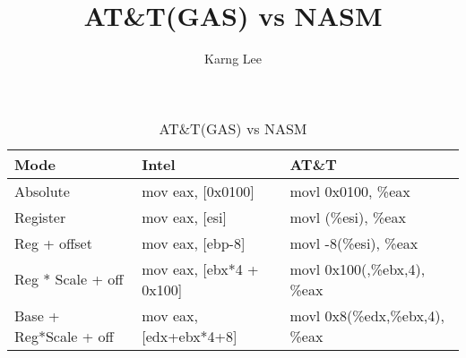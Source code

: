 \documentclass{article}
\title{AT\&T(GAS) vs NASM}
\author{Karng Lee}
\theoremstyle{mytheoremstyle}
\theoremstyle{mytheoremstyle}
\theoremstyle{myproblemstyle}
\begin{document}
    \maketitle
\begin{table}   
  \begin{center}
  \begin{tabular}{|l||l|l|}
    \hline
    Mode & Intel & AT\&T \\
    \hline
    \hline
    Absolute & mov eax, [0x0100] & movl 0x0100, \%eax \\
    \hline
    Register & mov eax, [esi] & movl (\%esi), \%eax \\
    \hline
    Reg + offset & mov eax, [ebp-8] & movl -8(\%esi), \%eax \\
    \hline
    Reg * Scale + off & mov eax, [ebx*4 + 0x100] & movl 0x100(,\%ebx,4), \%eax \\
    \hline
    Base + Reg*Scale + off & mov eax, [edx+ebx*4+8] & movl 0x8(\%edx,\%ebx,4), \%eax \\
    \hline
  \end{tabular}
    \caption{AT\&T(GAS) vs NASM}
    \label{tab:table1}
  \end{center}
\end{table}
\end{document}
